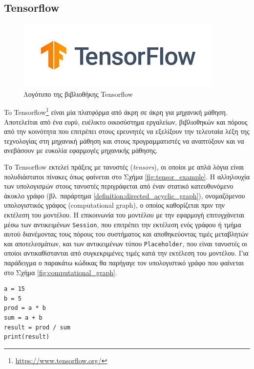 \subsection{Tensorflow}
\begin{figure}[h]
	\centering
	\includegraphics[scale=0.7]{images/chapter3/tensorflow_logo.png}
	\caption{Λογότυπο της βιβλιοθήκης Tensorflow}
\end{figure}

To Tensorflow\footnote{\href{https://www.tensorflow.org/}{https://www.tensorflow.org/}} είναι μία πλατφόρμα από άκρη σε άκρη για μηχανική μάθηση. Αποτελείται από ένα ευρύ, ευέλικτο οικοσύστημα εργαλείων, βιβλιοθηκών και πόρους από την κοινότητα που επιτρέπει στους ερευνητές να εξελίξουν την τελευταία λέξη της τεχνολογίας στη μηχανική μάθηση και στους προγραμματιστές να αναπτύξουν και να ανεβάσουν με ευκολία εφαρμογές μηχανικής μάθησης.

Το Tensorflow εκτελεί πράξεις με τανυστές (\textsl{tensors}), οι οποίοι με απλά λόγια είναι πολυδιάστατοι πίνακες όπως φαίνεται στο Σχήμα \ref{fig:tensor_example}. H αλληλουχία των υπολογισμών στους τανυστές περιγράφεται από έναν στατικό κατευθυνόμενο άκυκλο γράφο (βλ. παράρτημα \ref{definition:directed_acyclic_graph}), ονομαζόμενου υπολογιστικός γράφος (computational graph), ο οποίος καθορίζεται πριν την εκτέλεση του μοντέλου. Η επικοινωνία του μοντέλου με την εφαρμογή επιτυγχάνεται μέσω των αντικειμένων \texttt{Session}, που επιτρέπει την εκτέλεση ενός γράφου ή τμήμα αυτού διανέμοντας τους πόρους του συστήματος και αποθηκεύοντας τιμές μεταβλητών και αποτελεσμάτων, και των αντικειμένων τύπου \texttt{Placeholder}, που είναι τανυστές οι οποίοι αντικαθίστανται από συγκεκριμένες τιμές κατά την εκτέλεση του μοντέλου. Για παράδειγμα ο παρακάτω κώδικας θα παρήγαγε τον υπολογιστικό γράφο που φαίνεται στο Σχήμα \ref{fig:computational_graph}.

\begin{verbatim}
a = 15
b = 5
prod = a * b
sum = a + b
result = prod / sum
print(result)
\end{verbatim}


